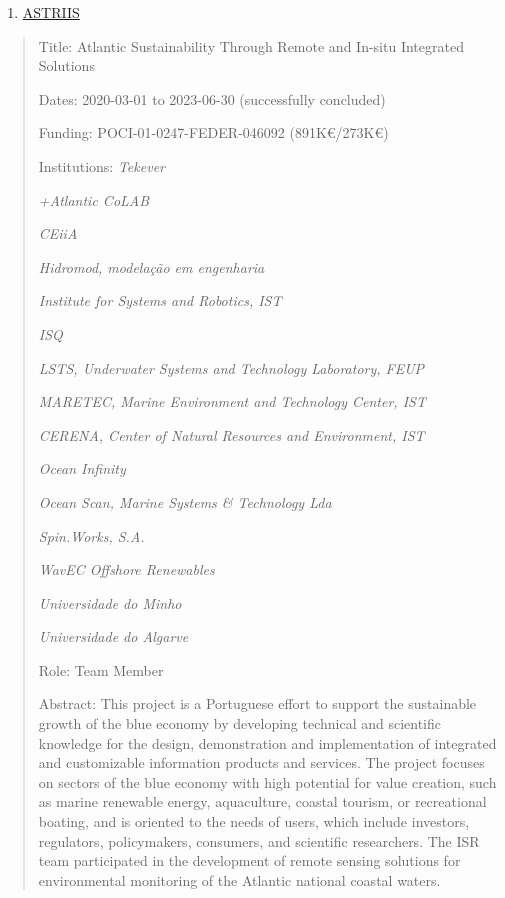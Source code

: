 \begin{enumerate}
\def\labelenumi{\arabic{enumi}.}
\setcounter{enumi}{3}
\item
  \ul{ASTRIIS}
\end{enumerate}

\begin{quote}
Title: Atlantic Sustainability Through Remote and In-situ Integrated
Solutions

Dates: 2020-03-01 to 2023-06-30 (successfully concluded)

Funding: POCI-01-0247-FEDER-046092 (891K€/273K€)

Institutions: \emph{Tekever}

\emph{+Atlantic CoLAB}

\emph{CEiiA}

\emph{Hidromod, modelação em engenharia}

\emph{Institute for Systems and Robotics, IST}

\emph{ISQ}

\emph{LSTS, Underwater Systems and Technology Laboratory, FEUP}

\emph{MARETEC, Marine Environment and Technology Center, IST}

\emph{CERENA, Center of Natural Resources and Environment, IST}

\emph{Ocean Infinity}

\emph{Ocean Scan, Marine Systems \& Technology Lda}

\emph{Spin.Works, S.A.}

\emph{WavEC Offshore Renewables}

\emph{Universidade do Minho}

\emph{Universidade do Algarve}

Role: Team Member

Abstract: This project is a Portuguese effort to support the sustainable
growth of the blue economy by developing technical and scientific
knowledge for the design, demonstration and implementation of integrated
and customizable information products and services. The project focuses
on sectors of the blue economy with high potential for value creation,
such as marine renewable energy, aquaculture, coastal tourism, or
recreational boating, and is oriented to the needs of users, which
include investors, regulators, policymakers, consumers, and scientific
researchers. The ISR team participated in the development of remote
sensing solutions for environmental monitoring of the Atlantic national
coastal waters.
\end{quote}

